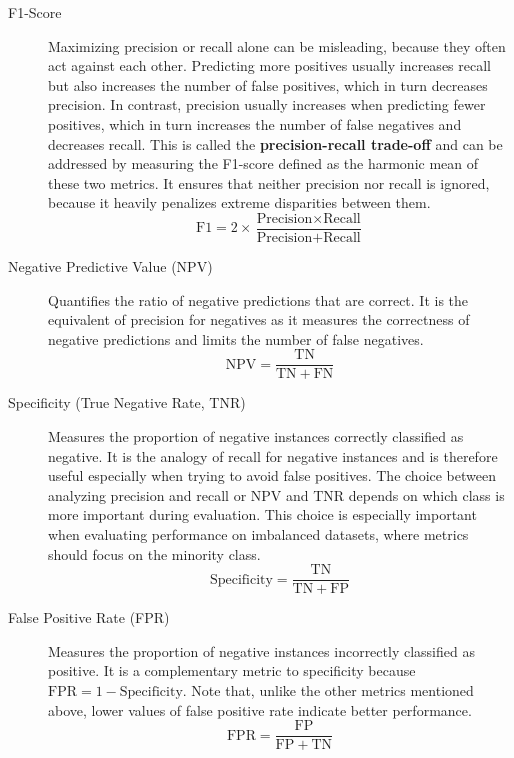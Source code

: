 \begin{description}
    \item[F1-Score] Maximizing precision or recall alone can be misleading, because they often act against each other. Predicting more positives usually increases recall but also increases the number of false positives, which in turn decreases precision. In contrast, precision usually increases when predicting fewer positives, which in turn increases the number of false negatives and decreases recall. This is called the \textbf{precision-recall trade-off} and can be addressed by measuring the F1-score defined as the harmonic mean of these two metrics. It ensures that neither precision nor recall is ignored, because it heavily penalizes extreme disparities between them.~\cite{Terven2025, Szeliski2022}
    \begin{equation}\label{eq:f1}
        \text{F1} = 2 \times \frac{\text{Precision} \times \text{Recall}}{\text{Precision} + \text{Recall}}
    \end{equation}

    \item[Negative Predictive Value (NPV)] Quantifies the ratio of negative predictions that are correct. It is the equivalent of precision for negatives as it measures the correctness of negative predictions and limits the number of false negatives.~\cite{Terven2025}
    \begin{equation}\label{eq:npv}
        \mathrm{NPV} = \frac{\mathrm{TN}}{\mathrm{TN} + \mathrm{FN}}
    \end{equation}

    \item[Specificity (True Negative Rate, TNR)] Measures the proportion of negative instances correctly classified as negative. It is the analogy of recall for negative instances and is therefore useful especially when trying to avoid false positives. The choice between analyzing precision and recall or NPV and TNR depends on which class is more important during evaluation. This choice is especially important when evaluating performance on imbalanced datasets, where metrics should focus on the minority class.~\cite{Terven2025}
    \begin{equation}\label{eq:tnr}
        \text{Specificity} = \frac{\mathrm{TN}}{\mathrm{TN} + \mathrm{FP}}
    \end{equation}

    \item[False Positive Rate (FPR)] Measures the proportion of negative instances incorrectly classified as positive. It is a complementary metric to specificity because $\mathrm{FPR} = 1 - \text{Specificity}$. Note that, unlike the other metrics mentioned above, lower values of false positive rate indicate better performance.~\cite{Terven2025, Szeliski2022}
    \begin{equation}\label{eq:fpr}
        \mathrm{FPR} = \frac{\mathrm{FP}}{\mathrm{FP} + \mathrm{TN}}
    \end{equation}


\end{description}
